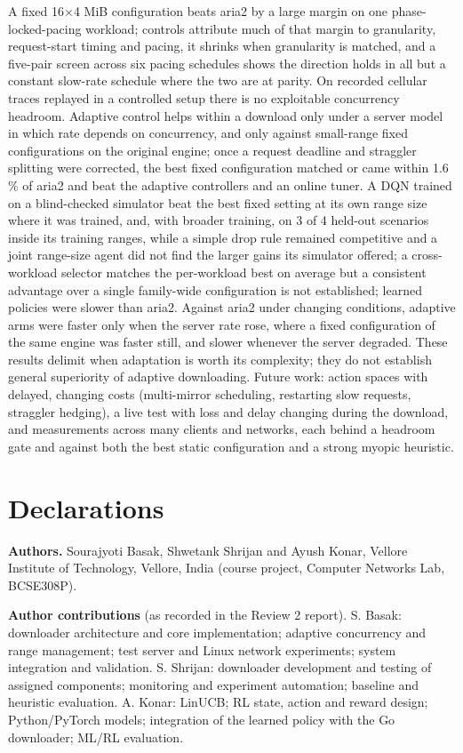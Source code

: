 \documentclass[conference]{IEEEtran}
\begin{document}
A fixed 16×4 MiB configuration beats aria2 by a large margin on one phase-locked-pacing workload; controls attribute much of that margin to granularity, request-start timing and pacing, it shrinks when granularity is matched, and a five-pair screen across six pacing schedules shows the direction holds in all but a constant slow-rate schedule where the two are at parity. On recorded cellular traces replayed in a controlled setup there is no exploitable concurrency headroom. Adaptive control helps within a download only under a server model in which rate depends on concurrency, and only against small-range fixed configurations on the original engine; once a request deadline and straggler splitting were corrected, the best fixed configuration matched or came within 1.6 \% of aria2 and beat the adaptive controllers and an online tuner. A DQN trained on a blind-checked simulator beat the best fixed setting at its own range size where it was trained, and, with broader training, on 3 of 4 held-out scenarios inside its training ranges, while a simple drop rule remained competitive and a joint range-size agent did not find the larger gains its simulator offered; a cross-workload selector matches the per-workload best on average but a consistent advantage over a single family-wide configuration is not established; learned policies were slower than aria2. Against aria2 under changing conditions, adaptive arms were faster only when the server rate rose, where a fixed configuration of the same engine was faster still, and slower whenever the server degraded. These results delimit when adaptation is worth its complexity; they do not establish general superiority of adaptive downloading. Future work: action spaces with delayed, changing costs (multi-mirror scheduling, restarting slow requests, straggler hedging), a live test with loss and delay changing during the download, and measurements across many clients and networks, each behind a headroom gate and against both the best static configuration and a strong myopic heuristic.


\section*{Declarations}

\textbf{Authors.} Sourajyoti Basak, Shwetank Shrijan and Ayush Konar, Vellore Institute of Technology, Vellore, India (course project, Computer Networks Lab, BCSE308P).


\textbf{Author contributions} (as recorded in the Review 2 report). S. Basak: downloader architecture and core implementation; adaptive concurrency and range management; test server and Linux network experiments; system integration and validation. S. Shrijan: downloader development and testing of assigned components; monitoring and experiment automation; baseline and heuristic evaluation. A. Konar: LinUCB; RL state, action and reward design; Python/PyTorch models; integration of the learned policy with the Go downloader; ML/RL evaluation.
\end{document}
